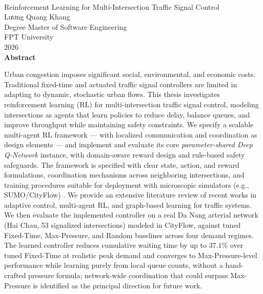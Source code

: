 \documentclass[12pt]{report} %
\newcommand{\thesistitle}{	
Reinforcement Learning for Multi-Intersection Traffic Signal Control}
\newcommand{\authorname}{Lương Quang Khang}
\newcommand{\yearofconvocation}{2026}
\begin{document}
\cleardoublepage
{}
\noindent{}\\[1cm]
\begin{center}
{\large \thesistitle}\\
{\large \authorname}\\
Degree Master of Software Engineering\\
FPT University\\
\yearofconvocation\\
\vspace{1cm}
\textbf{Abstract}\\
\end{center}
Urban congestion imposes significant social, environmental, and economic costs. Traditional fixed-time and actuated traffic signal controllers are limited in adapting to dynamic, stochastic urban flows. This thesis investigates reinforcement learning (RL) for multi-intersection traffic signal control, modeling intersections as agents that learn policies to reduce delay, balance queues, and improve throughput while maintaining safety constraints. We specify a scalable multi-agent RL framework --- with localized communication and coordination as design elements --- and implement and evaluate its core \emph{parameter-shared Deep Q-Network} instance, with domain-aware reward design and rule-based safety safeguards. The framework is specified with clear state, action, and reward formulations, coordination mechanisms across neighboring intersections, and training procedures suitable for deployment with microscopic simulators (e.g., SUMO/CityFlow) \cite{SimulationPlatforms_Comparison2023}. We provide an extensive literature review of recent works in adaptive control, multi-agent RL, and graph-based learning for traffic systems. We then evaluate the implemented controller on a real Da Nang arterial network (Hai Chau, 53 signalized intersections) modeled in CityFlow, against tuned Fixed-Time, Max-Pressure, and Random baselines across four demand regimes. The learned controller reduces cumulative waiting time by up to $37.1\%$ over tuned Fixed-Time at realistic peak demand and converges to Max-Pressure-level performance while learning purely from local queue counts, without a hand-crafted pressure formula; network-wide coordination that could surpass Max-Pressure is identified as the principal direction for future work.
\end{document}
